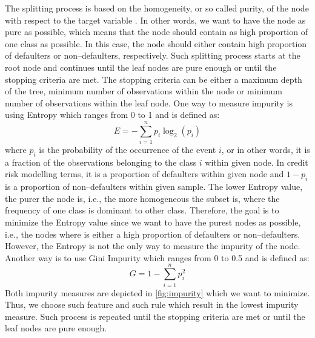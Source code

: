 The splitting process is based on the homogeneity, or so called purity, of the node with respect to the target variable \citep{provost2013data}.
In other words, we want to have the node as pure as possible, which means that the node should contain as high proportion of one class as possible.
In this case, the node should either contain high proportion of defaulters or non--defaulters, respectively.
Such splitting process starts at the root node and continues until the leaf nodes are pure enough or until the stopping criteria are met.
The stopping criteria can be either a maximum depth of the tree, minimum number of observations within the node or minimum number of observations within the leaf node.
One way to measure impurity is using Entropy which ranges from 0 to 1 and is defined as:
\begin{equation}\label{eq}
    E = -\sum_{i=1}^{n} p_i \log_2 \left(p_i\right)
    \end{equation}
where $p_i$ is the probability of the occurrence of the event $i$, or in other words, it is a fraction of the observations belonging to the class $i$ within given node. In credit risk modelling terms, it is a proportion of defaulters within given node and $1-p_i$ is a proportion of non--defaulters within given sample.
The lower Entropy value, the purer the node is, i.e., the more homogeneous the subset is, where the frequency of one class is dominant to other class.
Therefore, the goal is to minimize the Entropy value since we want to have the purest nodes as possible, i.e., the nodes where is either a high proportion of defaulters or non--defaulters. 
However, the Entropy is not the only way to measure the impurity of the node. Another way is to use Gini Impurity which ranges from 0 to 0.5 and is defined as:
\begin{equation}\label{eq}
    G = 1 - \sum_{i=1}^{n} p_{i}^{2}
\end{equation}
Both impurity measures are depicted in \autoref{fig:impurity} which we want to minimize. Thus, we choose such feature and such rule which result in the lowest impurity measure. Such process is repeated until the stopping criteria are met or until the leaf nodes are pure enough.

